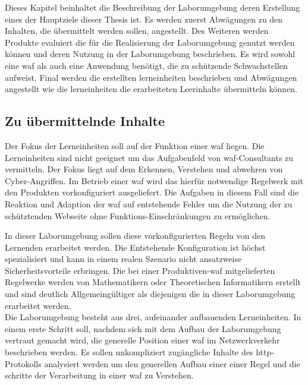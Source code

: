 Dieses Kapitel beinhaltet die Beschreibung der Laborumgebung deren Erstellung eines der Hauptziele dieser Thesis ist.
Es werden zuerst Abwägungen zu den Inhalten, die übermittelt werden sollen, angestellt.
Des Weiteren werden Produkte evaluiert die für die Realisierung der Laborumgebung genutzt werden können und deren Nutzung in der Laborumgebung beschrieben.
Es wird sowohl eine \ac{waf} als auch eine Anwendung benötigt, die zu schützende Schwachstellen aufweist.
Final werden die erstellten lerneinheiten beschrieben und Abwägungen angestellt wie die lerneinheiten die erarbeiteten Leerinhalte übermitteln können.

\subsection{Zu übermittelnde Inhalte}
\label{sec:inhalte}


Der Fokus der Lerneinheiten soll auf der Funktion einer \ac{waf} liegen.
Die Lerneinheiten sind nicht geeignet um das Aufgabenfeld von \ac{waf}-Consultants zu vermitteln.
Der Fokus liegt auf dem Erkennen, Verstehen und abwehren von Cyber-Angriffen.
Im Betrieb einer \ac{waf} wird das hierfür notwendige Regelwerk mit den Produkten vorkonfiguriert ausgeliefert.
Die Aufgaben in diesem Fall sind die Reaktion und Adaption der \ac{waf} auf entstehende Fehler um die Nutzung der zu schütztenden Webseite ohne Funktions-Einschränkungen zu ermöglichen.

In dieser Laborumgebung sollen diese vorkonfigurierten Regeln von den Lernenden erarbeitet werden.
Die Entstehende Konfiguration ist höchst spezialisiert und kann in einem realen Szenario nicht ansatzweise Sicherheitsvorteile erbringen.
Die bei einer Produktiven-\ac{waf} mitgelieferten Regelwerke werden von Mathematikern oder Theoretischen Informatikern erstellt und sind deutlich Allgemeingültiger als diejenigen die in dieser Laborumgebung erarbeitet werden.\\

Die Laborumgebung besteht aus drei, aufeinander aufbauenden Lerneinheiten.
In einem erste Schritt soll, nachdem sich mit dem Aufbau der Laborumgebung vertraut gemacht wird, die generelle Position einer \ac{waf} im Netzwerkverkehr beschrieben werden.
Es sollen unkompliziert zugängliche Inhalte des \ac{http}-Protokolls analysiert werden um den generellen Aufbau einer einer Regel und die schritte der Verarbeitung in einer \ac{waf} zu Verstehen.\\

